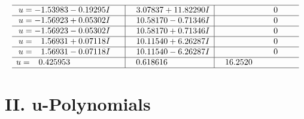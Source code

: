 \documentclass[1p]{elsarticle_modified}
\theoremstyle{definition}
\begin{document}
$$\begin{array}{c|c|c}
 \hline 
\begin{aligned}
u &= -1.53983 - 0.19295 I\end{aligned}
 & \phantom{-}3.07837 + 11.82290 I & \phantom{-0.000000 } 0 \\ \hline\begin{aligned}
u &= -1.56923 + 0.05302 I\end{aligned}
 & \phantom{-}10.58170 - 0.71346 I & \phantom{-0.000000 } 0 \\ \hline\begin{aligned}
u &= -1.56923 - 0.05302 I\end{aligned}
 & \phantom{-}10.58170 + 0.71346 I & \phantom{-0.000000 } 0 \\ \hline\begin{aligned}
u &= \phantom{-}1.56931 + 0.07118 I\end{aligned}
 & \phantom{-}10.11540 + 6.26287 I & \phantom{-0.000000 } 0 \\ \hline\begin{aligned}
u &= \phantom{-}1.56931 - 0.07118 I\end{aligned}
 & \phantom{-}10.11540 - 6.26287 I & \phantom{-0.000000 } 0 \\ \hline\begin{aligned}
u &= \phantom{-}0.425953\phantom{ +0.000000I}\end{aligned}
 & \phantom{-}0.618616\phantom{ +0.000000I} & \phantom{-}16.2520\phantom{ +0.000000I}\\
 \hline 
 \end{array}$$\newpage
\newpage\renewcommand{\arraystretch}{1}
\centering \section*{ II. u-Polynomials}
\end{document}
